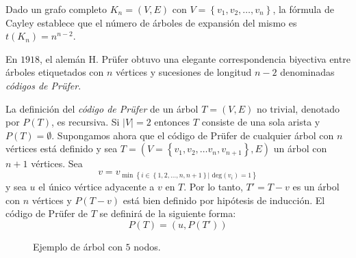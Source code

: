 \begin{proposition}\label{prop:1}
Dado un grafo completo $K_n = (V,E)$ con $V=\left\lbrace v_1,v_2,\dots,v_n\right\rbrace$, la fórmula de Cayley establece que el número de árboles de expansión del mismo es $t(K_n) = n^{n-2}$.
\end{proposition}

En $1918$, el alemán H. Prüfer obtuvo una elegante correspondencia biyectiva entre árboles etiquetados con $n$ vértices y sucesiones de longitud $n-2$ denominadas \emph{códigos de Prüfer}.

\begin{definition}
La definición del \emph{código de Prüfer} de un árbol $T = (V,E)$ no trivial, denotado por $P(T)$, es recursiva. Si $|V| = 2$ entonces $T$ consiste de una sola arista y $P(T) = \emptyset$. Supongamos ahora que el código de Prüfer de cualquier árbol con $n$ vértices está definido  y sea $T = (V = \left\lbrace v_1, v_2,\dots v_n, v_{n+1} \right\rbrace,E)$ un árbol con $n+1$ vértices. Sea
\begin{equation}
v = v_{\min \left\lbrace i \in \left\lbrace 1,2,\dots,n,n+1 \right\rbrace | \text{ deg}(v_i) = 1\right\rbrace}
\end{equation}
y sea $u$ el único vértice adyacente a $v$ en $T$. Por lo tanto, $T' = T - v$ es un árbol con $n$ vértices y $P(T-v)$ está bien definido por hipótesis de inducción. El código de Prüfer de $T$ se definirá de la siguiente forma:
\begin{equation}
P(T) = (u,P(T'))
\end{equation}
\end{definition}

\begin{figure}[H]
\centering
{}
\caption{Ejemplo de árbol con $5$ nodos.}
\label{fig:arbol1}
\end{figure}

